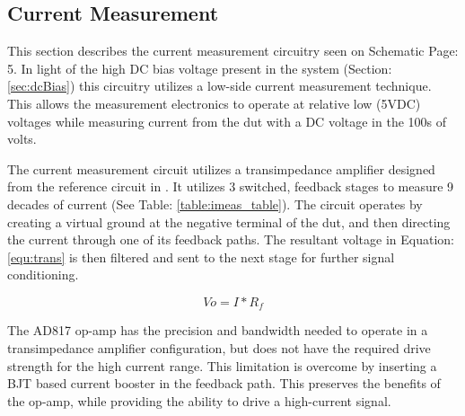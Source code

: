 \subsection{Current Measurement}
\label{sec:iMeas}

This section describes the current measurement circuitry seen on Schematic Page: 5. In light of the high DC bias voltage present in the system (Section: \ref{sec:dcBias}) this circuitry utilizes a low-side current measurement technique. This allows the measurement electronics to operate at relative low (5VDC) voltages while measuring current from the \gls{dut} with a DC voltage in the 100s of volts.



The current measurement circuit utilizes a transimpedance amplifier designed from the reference circuit in \cite{steve_thesis}. It utilizes 3 switched, feedback stages to measure 9 decades of current (See Table: \ref{table:imeas_table}). The circuit operates by creating a virtual ground at the negative terminal of the \gls{dut}, and then directing the current through one of its feedback paths. The resultant voltage in Equation: \eqref{equ:trans} is then filtered and sent to the next stage for further signal conditioning.

\begin{equation}
\label{equ:trans}
Vo = I*R_f
\end{equation}

The AD817 op-amp has the precision and bandwidth needed to operate in a transimpedance amplifier configuration, but does not have the required drive strength for the  high current range. This limitation is overcome by inserting a BJT based current booster in the feedback path. This preserves the benefits of the op-amp, while providing the ability to drive a high-current signal.

